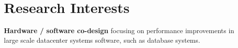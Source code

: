 \section{Research Interests}

\textbf{Hardware / software co-design} focusing on performance improvements in
large scale datacenter systems software, such as database systems.
